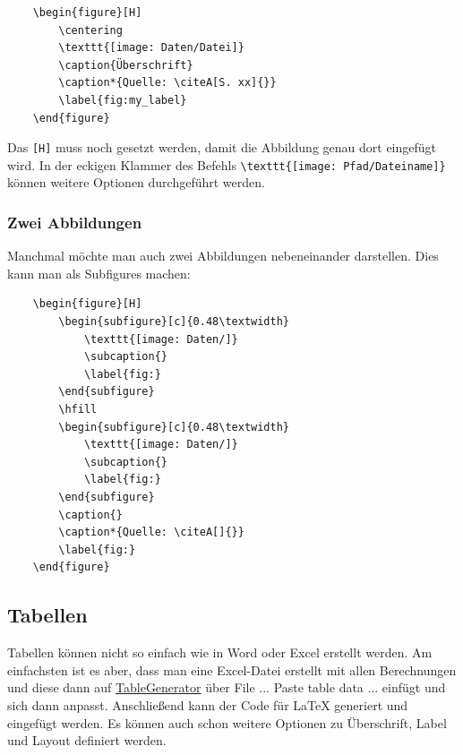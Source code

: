 \begin{verbatim}
    \begin{figure}[H]
        \centering
        \texttt{[image: Daten/Datei]}
        \caption{Überschrift}
        \caption*{Quelle: \citeA[S. xx]{}}
        \label{fig:my_label}
    \end{figure}
\end{verbatim}

Das \verb|[H]| muss noch gesetzt werden, damit die Abbildung genau dort eingefügt wird. In der eckigen Klammer des Befehls \verb|\texttt{[image: Pfad/Dateiname]}| können weitere Optionen durchgeführt werden.

\subsubsection{Zwei Abbildungen}

Manchmal möchte man auch zwei Abbildungen nebeneinander darstellen. Dies kann man als Subfigures machen:

\begin{verbatim}
    \begin{figure}[H]
        \begin{subfigure}[c]{0.48\textwidth}
            \texttt{[image: Daten/]}
            \subcaption{}
            \label{fig:}
        \end{subfigure}
        \hfill
        \begin{subfigure}[c]{0.48\textwidth}
            \texttt{[image: Daten/]}
            \subcaption{}
            \label{fig:}
        \end{subfigure}
        \caption{}
        \caption*{Quelle: \citeA[]{}}
        \label{fig:}
    \end{figure}
\end{verbatim}


\subsection{Tabellen}

Tabellen können nicht so einfach wie in Word oder Excel erstellt werden. Am einfachsten ist es aber, dass man eine Excel-Datei erstellt mit allen Berechnungen und diese dann auf \href{https://www.tablesgenerator.com/latex_tables}{TableGenerator} über File ... Paste table data ... einfügt und sich dann anpasst. Anschließend kann der Code für \LaTeX{} generiert und eingefügt werden. Es können auch schon weitere Optionen zu Überschrift, Label und Layout definiert werden.

